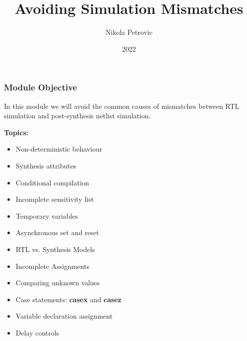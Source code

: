 \documentclass[t, notes, xcolor=table]{beamer}
\title{Avoiding Simulation Mismatches}
\author{Nikola Petrovic}
\institute{University of Belgrade, School of Electrical Engineering}
\date{2022}
\begin{document}
\frame{\titlepage}

\begin{frame}
\frametitle{Module Objective}
\footnotesize{
In this module we will avoid the common causes of mismatches between RTL simulation and post-synthesis netlist simulation.
\newline

\textbf{Topics:}
\begin{itemize}
\item Non-deterministic behaviour
\item Synthesis attributes
\item Conditional compilation
\item Incomplete sensitivity list
\item Temporary variables
\item Asynchronous set and reset
\item RTL vs. Synthesis Models
\item Incomplete Assignments
\item Comparing unknown values
\item Case statements: \textbf{casex} and \textbf{casez}
\item Variable declaration assignment
\item Delay controls
\end{itemize}
}
\end{frame}
\end{document}
